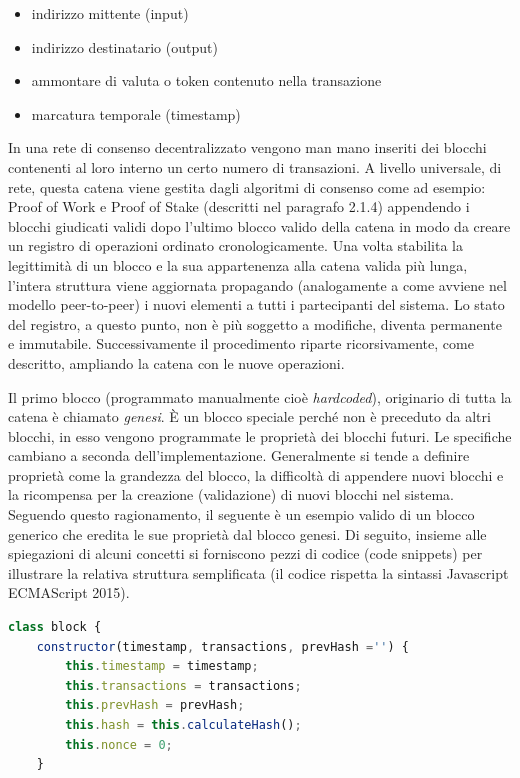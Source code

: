 \begin{itemize}
\item indirizzo mittente (input) 
\item indirizzo destinatario (output)
\item ammontare di valuta o token contenuto nella transazione
\item marcatura temporale (timestamp)
\end{itemize}

In una rete di consenso decentralizzato vengono man mano inseriti dei blocchi contenenti al loro interno un certo numero di transazioni. A livello universale, di rete, questa catena viene gestita dagli algoritmi di consenso come ad esempio: Proof of Work e Proof of Stake (descritti nel paragrafo 2.1.4) appendendo i blocchi giudicati validi dopo l'ultimo blocco valido della catena in modo da creare un registro di operazioni ordinato cronologicamente. Una volta stabilita la legittimità di un blocco e la sua appartenenza alla catena valida più lunga, l’intera struttura viene aggiornata propagando (analogamente a come avviene nel modello peer-to-peer) i nuovi elementi a tutti i partecipanti del sistema. Lo stato del registro, a questo punto, non è più soggetto a modifiche, diventa permanente e immutabile. Successivamente il procedimento riparte ricorsivamente, come descritto, ampliando la catena con le nuove operazioni.

Il primo blocco \smallskip {} (programmato manualmente cioè \emph{hardcoded}), originario di tutta la catena è chiamato \emph{genesi}. È un blocco speciale perché non è preceduto da altri blocchi, in esso vengono programmate le proprietà dei blocchi futuri. Le specifiche cambiano a seconda dell’implementazione. Generalmente si tende a definire proprietà come la grandezza del blocco, la difficoltà di appendere nuovi blocchi e la ricompensa per la creazione (validazione) di nuovi blocchi nel sistema. 
Seguendo questo ragionamento, il seguente è un esempio valido di un blocco generico che eredita le sue proprietà dal blocco genesi.
Di seguito, insieme alle spiegazioni di alcuni concetti si forniscono pezzi di codice (code snippets) per illustrare la relativa struttura semplificata (il codice rispetta la sintassi Javascript ECMAScript 2015). 

\begin{lstlisting}[caption={Esempio di struttura di un blocco},language=JavaScript]
class block {
    constructor(timestamp, transactions, prevHash ='') {
        this.timestamp = timestamp;
        this.transactions = transactions;
        this.prevHash = prevHash;
        this.hash = this.calculateHash();
        this.nonce = 0;
    }
\end{lstlisting}

